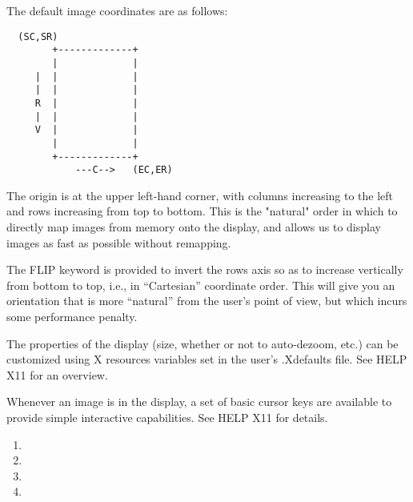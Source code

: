 The default image coordinates are as follows:
\begin{verbatim} 
  (SC,SR)
        +-------------+
        |             |
     |  |             |
     |  |             |
     R  |             |
     |  |             |
     V  |             |
        |             |
        +-------------+
            ---C-->   (EC,ER)
\end{verbatim}

The origin is at the upper left-hand corner, with columns increasing to the
left and rows increasing from top to bottom.  This is the "natural" order
in which to directly map images from memory onto the display, and allows us
to display images as fast as possible without remapping.
 
The FLIP keyword is provided to invert the rows axis so as to increase
vertically from bottom to top, i.e., in ``Cartesian'' coordinate order.
This will give you an orientation that is more ``natural'' from the user's
point of view, but which incurs some performance penalty.
 
The properties of the display (size, whether or not to auto-dezoom, etc.)
can be customized using X resources variables set in the user's .Xdefaults
file.  See HELP X11 for an overview.
 
Whenever an image is in the display, a set of basic cursor keys are
available to provide simple interactive capabilities.  See HELP X11 for
details.
 
\begin{enumerate}
  \item{
}
  \item{
}
  \item{
}
  \item{
}
\end{enumerate}

